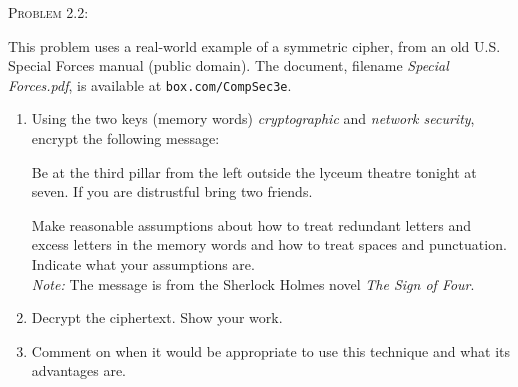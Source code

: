 \documentclass[12pt]{article}
\newenvironment{problem}[1]
{\begin{mdframed}[linewidth=0.8pt]
        \textsc{Problem #1:}

}
    {\end{mdframed}}
\begin{document}
	\begin{problem}{2.2}
		This problem uses a real-world example of a symmetric cipher,
		from an old U.S. Special Forces manual (public domain). The
		document, filename \textit{Special Forces.pdf}, is available at
		\verb|box.com/CompSec3e|.
		\begin{enumerate}[label=\alph*]
			\item Using the two keys (memory words) \textit{cryptographic}
				and \textit{network security}, encrypt the following
				message:

				Be at the third pillar from the left outside the
				lyceum theatre tonight at seven. If you are distrustful
				bring two friends.

				Make reasonable assumptions about how to treat redundant
				letters and excess letters in the memory words and how to
				treat spaces and punctuation. Indicate what your assumptions
				are.\\
				\textit{Note:} The message is from the Sherlock Holmes novel
				\textit{The Sign of Four}.
			\item Decrypt the ciphertext. Show your work.
			\item Comment on when it would be appropriate to use this technique
				and what its advantages are.
		\end{enumerate}
	\end{problem}
\end{document}
